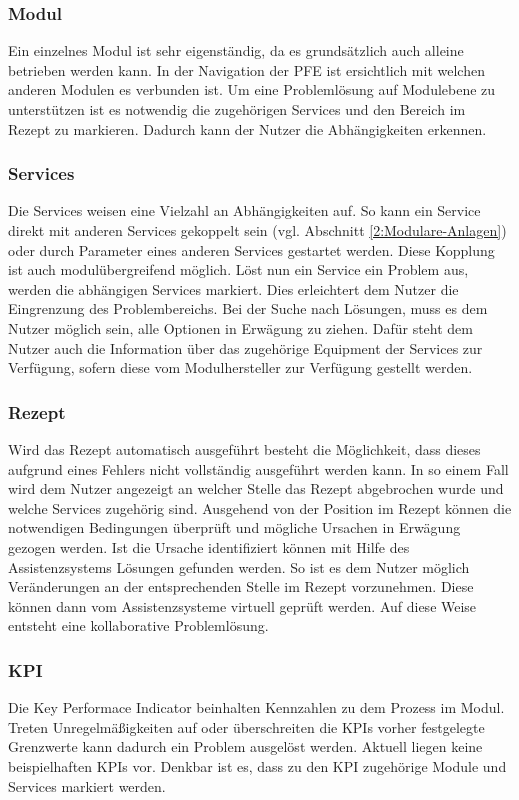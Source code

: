 \subsubsection*{Modul}
Ein einzelnes Modul ist sehr eigenständig, da es grundsätzlich auch alleine betrieben werden kann. In der Navigation der PFE ist ersichtlich mit welchen anderen Modulen es verbunden ist. Um eine Problemlösung auf Modulebene zu unterstützen ist es notwendig die zugehörigen Services und den Bereich im Rezept zu markieren. Dadurch kann der Nutzer die Abhängigkeiten erkennen. 

\subsubsection*{Services}
Die Services weisen eine Vielzahl an Abhängigkeiten auf. So kann ein Service direkt mit anderen Services gekoppelt sein (vgl. Abschnitt \ref{2:Modulare-Anlagen}) oder durch Parameter eines anderen Services gestartet werden. Diese Kopplung ist auch modulübergreifend möglich. Löst nun ein Service ein Problem aus, werden die abhängigen Services markiert. Dies erleichtert dem Nutzer die Eingrenzung des Problembereichs. Bei der Suche nach Lösungen, muss es dem Nutzer möglich sein, alle Optionen in Erwägung zu ziehen. Dafür steht dem Nutzer auch die Information über das zugehörige Equipment der Services zur Verfügung, sofern diese vom Modulhersteller zur Verfügung gestellt werden.

\subsubsection*{Rezept}
Wird das Rezept automatisch ausgeführt besteht die Möglichkeit, dass dieses aufgrund eines Fehlers nicht vollständig ausgeführt werden kann. In so einem Fall wird dem Nutzer angezeigt an welcher Stelle das Rezept abgebrochen wurde und welche Services zugehörig sind. Ausgehend von der Position im Rezept können die notwendigen Bedingungen überprüft und mögliche Ursachen in Erwägung gezogen werden. Ist die Ursache identifiziert können mit Hilfe des Assistenzsystems Lösungen gefunden werden. So ist es dem Nutzer möglich Veränderungen an der entsprechenden Stelle im Rezept vorzunehmen. Diese können dann vom Assistenzsysteme virtuell geprüft werden. Auf diese Weise entsteht eine kollaborative Problemlösung.  

\subsubsection*{KPI}
Die Key Performace Indicator beinhalten Kennzahlen zu dem Prozess im Modul. Treten Unregelmäßigkeiten auf oder überschreiten die KPIs vorher festgelegte Grenzwerte kann dadurch ein Problem ausgelöst werden. Aktuell liegen keine beispielhaften KPIs vor. Denkbar ist es, dass zu den KPI zugehörige Module und Services markiert werden.

